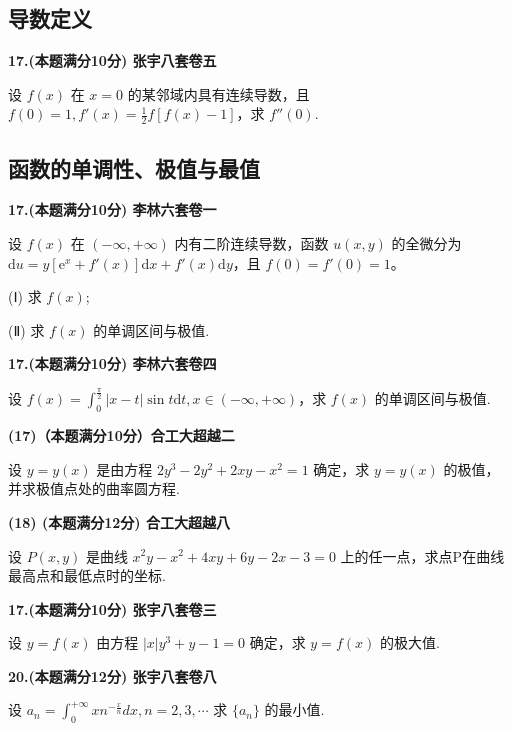 \documentclass[a4paper,12pt]{article}
\begin{document}
\subsection{导数定义}

\textbf{17.(本题满分10分) 张宇八套卷五}

设 $f(x)$ 在 $x=0$ 的某邻域内具有连续导数，且 $f(0)=1, f'(x)=\frac{1}{2}f[f(x)-1]$，求 $f''(0)$.

\subsection{函数的单调性、极值与最值}

\textbf{17.(本题满分10分) 李林六套卷一}

设 $f(x)$ 在 $(-\infty, +\infty)$ 内有二阶连续导数，函数 $u(x, y)$ 的全微分为 $\mathrm{d}u = y \left[ \mathrm{e}^{x} + f'(x) \right] \mathrm{d}x + f'(x) \mathrm{d}y$，且 $f(0) = f'(0) = 1$。

(Ⅰ) 求 $f(x)$;

(Ⅱ) 求 $f(x)$ 的单调区间与极值.

\vspace{0.5cm}

\textbf{17.(本题满分10分) 李林六套卷四}

设 $f(x)=\int_{0}^{\frac{\pi}{2}}|x-t|\sin t\mathrm{d}t,x\in(-\infty,+\infty)$，求 $f(x)$ 的单调区间与极值.

\vspace{0.5cm}

\textbf{(17)（本题满分10分）合工大超越二}

设 $y = y(x)$ 是由方程 $2y^{3} - 2y^{2} + 2xy - x^{2} = 1$ 确定，求 $y = y(x)$ 的极值，并求极值点处的曲率圆方程.

\vspace{0.5cm}

\textbf{(18) (本题满分12分) 合工大超越八}

设 $P(x,y)$ 是曲线 $x^{2}y-x^{2}+4xy+6y-2x-3=0$ 上的任一点，求点P在曲线最高点和最低点时的坐标.

\vspace{0.5cm}

\textbf{17.(本题满分10分) 张宇八套卷三}

设 $y = f(x)$ 由方程 $\left| x \right| y^{3} + y - 1 = 0$ 确定，求 $y = f(x)$ 的极大值.

\vspace{0.5cm}

\textbf{20.(本题满分12分) 张宇八套卷八}

设 $a_{n}=\int_{0}^{+\infty}x n^{-\frac{x}{n}}dx,n=2,3,\cdots$ 求 $\{a_{n}\}$ 的最小值.
\end{document}
